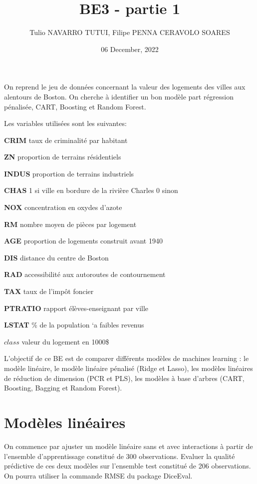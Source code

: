 \documentclass[
]{article}
\title{BE3 - partie 1}
\author{Tulio NAVARRO TUTUI, Filipe PENNA CERAVOLO SOARES}
\date{06 December, 2022}
\begin{document}
\maketitle

On reprend le jeu de données concernant la valeur des logements des
villes aux alentours de Boston. On cherche à identifier un bon modèle
part régression pénalisée, CART, Boosting et Random Forest.

Les variables utilisées sont les suivantes:

\textbf{CRIM} taux de criminalité par habitant

\textbf{ZN} proportion de terrains résidentiels

\textbf{INDUS} proportion de terrains industriels

\textbf{CHAS} 1 si ville en bordure de la rivière Charles 0 sinon

\textbf{NOX} concentration en oxydes d'azote

\textbf{RM} nombre moyen de pièces par logement

\textbf{AGE} proportion de logements construit avant 1940

\textbf{DIS} distance du centre de Boston

\textbf{RAD} accessibilité aux autoroutes de contournement

\textbf{TAX} taux de l'impôt foncier

\textbf{PTRATIO} rapport élèves-enseignant par ville

\textbf{LSTAT} \% de la population `a faibles revenus

\textbf{\(class\)} valeur du logement en 1000\$

L'objectif de ce BE est de comparer différents modèles de machines
learning : le modèle linéaire, le modèle linéaire pénalisé (Ridge et
Lasso), les modèles linéaires de réduction de dimension (PCR et PLS),
les modèles à base d'arbres (CART, Boosting, Bagging et Random Forest).

\hypertarget{moduxe8les-linuxe9aires}{%
\section{Modèles linéaires}\label{moduxe8les-linuxe9aires}}

On commence par ajuster un modèle linéaire sans et avec interactions à
partir de l'ensemble d'apprentissage constitué de 300 observations.
Evaluer la qualité prédictive de ces deux modèles sur l'ensemble test
constitué de 206 observations. On pourra utiliser la commande RMSE du
package DiceEval.
\end{document}
